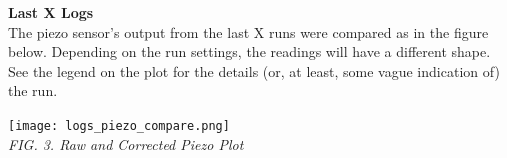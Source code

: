 \documentclass{article}
\begin{document}
	\twocolumn
	
	{\centering\textbf{Last X Logs}\\}
	The piezo sensor's output from the last X runs were compared as in the figure below. Depending on the run settings, the readings will have a different shape. See the legend on the plot for the details (or, at least, some vague indication of) the run.
	
	{\centering \texttt{[image: logs\_piezo\_compare.png]}\\
	\textit{FIG. 3. Raw and Corrected Piezo Plot}\\}
	
\end{document}
